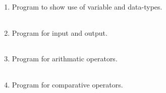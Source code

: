 \documentclass{exam}
\begin{document}
  \begin{enumerate}
   \item Program to show use of variable and data-types.

   \begin{myTableStyle}
   \begin{center} \begin{tabular}{ |m{14cm}| } \hline
              \\ \hline
    \end{tabular} \end{center}
\end{myTableStyle}
  \pagebreak

   \item  Program for input and output.

   \begin{myTableStyle}
   \begin{center} \begin{tabular}{ |m{14cm}| } \hline
              \\ \hline
    \end{tabular} \end{center}
\end{myTableStyle}
  \pagebreak

   \item  Program for arithmatic operators.

   \begin{myTableStyle}
   \begin{center} \begin{tabular}{ |m{14cm}| } \hline
              \\ \hline
    \end{tabular} \end{center}
\end{myTableStyle}
  \pagebreak

   \item  Program for comparative operators.

   \begin{myTableStyle}
   \begin{center} \begin{tabular}{ |m{14cm}| } \hline
              \\ \hline
    \end{tabular} \end{center}
\end{myTableStyle}
  \pagebreak


\end{enumerate}
\end{document}
